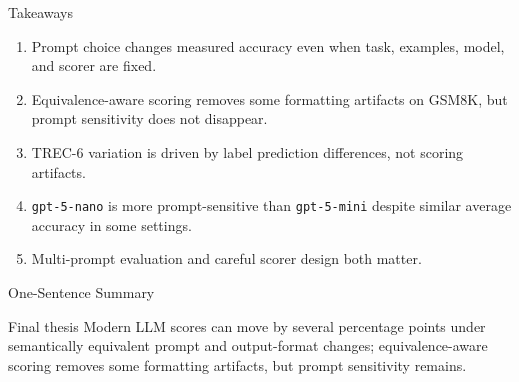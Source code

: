 \documentclass[aspectratio=169,11pt]{beamer}
\begin{document}
\begin{frame}{Takeaways}
  \begin{enumerate}
    \item Prompt choice changes measured accuracy even when task, examples, model, and scorer are fixed.
    \item Equivalence-aware scoring removes some formatting artifacts on GSM8K, but prompt sensitivity does not disappear.
    \item TREC-6 variation is driven by label prediction differences, not scoring artifacts.
    \item \texttt{gpt-5-nano} is more prompt-sensitive than \texttt{gpt-5-mini} despite similar average accuracy in some settings.
    \item Multi-prompt evaluation and careful scorer design both matter.
  \end{enumerate}
\end{frame}

\begin{frame}{One-Sentence Summary}
  \begin{block}{Final thesis}
    Modern LLM scores can move by several percentage points under semantically equivalent prompt and output-format changes; equivalence-aware scoring removes some formatting artifacts, but prompt sensitivity remains.
  \end{block}
\end{frame}
\end{document}

